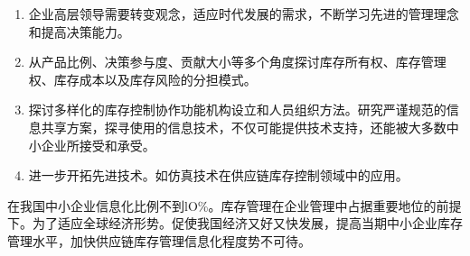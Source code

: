     \begin{enumerate}
        \item  企业高层领导需要转变观念，适应时代发展的需求，不断学习先进的管理理念和提高决策能力。
        \item  从产品比例、决策参与度、贡献大小等多个角度探讨库存所有权、库存管理权、库存成本以及库存风险的分担模式。
        \item  探讨多样化的库存控制协作功能机构设立和人员组织方法。研究严谨规范的信息共享方案，探寻使用的信息技术，不仅可能提供技术支持，还能被大多数中小企业所接受和承受。
        \item  进一步开拓先进技术。如仿真技术在供应链库存控制领域中的应用。
    \end{enumerate}

    在我国中小企业信息化比例不到lO\%。库存管理在企业管理中占据重要地位的前提下。为了适应全球经济形势。促使我国经济又好又快发展，提高当期中小企业库存管理水平，加快供应链库存管理信息化程度势不可待。
